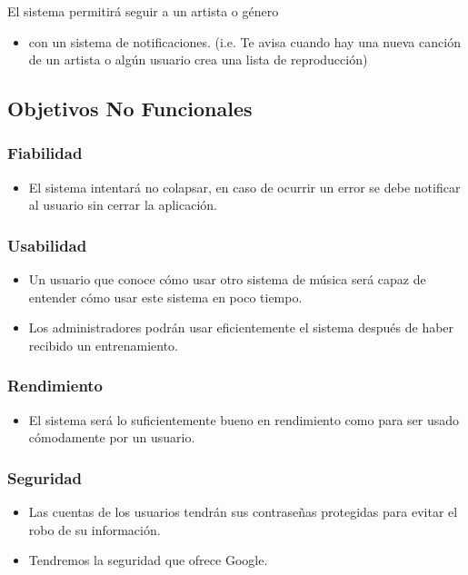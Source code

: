\documentclass[12pt]{article}
\newcounter{ni}
\begin{document}
El sistema permitirá seguir a un artista o género
\begin{itemize}
    \item con un sistema de notificaciones. (i.e. Te avisa cuando hay una nueva canción de un artista o algún usuario crea una lista de reproducción)
\end{itemize}


\subsection{Objetivos No Funcionales}

\subsubsection{Fiabilidad}
\begin{itemize}
    \item El sistema intentará no colapsar, en caso de ocurrir un error se debe notificar al usuario sin cerrar la aplicación. 
\end{itemize}

\subsubsection{Usabilidad}
\begin{itemize}
    \item Un usuario que conoce cómo usar otro sistema de música será capaz de entender cómo usar este sistema en poco tiempo.
    
    \item Los administradores podrán usar eficientemente el sistema después de haber recibido un entrenamiento.
\end{itemize}


\subsubsection{Rendimiento}
\begin{itemize}
    \item El sistema será lo suficientemente bueno en rendimiento como para ser usado cómodamente por un usuario.
\end{itemize}


\subsubsection{Seguridad}
\begin{itemize}
    \item Las cuentas de los usuarios tendrán sus contraseñas protegidas para evitar el robo de su información.
    \item Tendremos la seguridad que ofrece Google.
\end{itemize}
\end{document}
